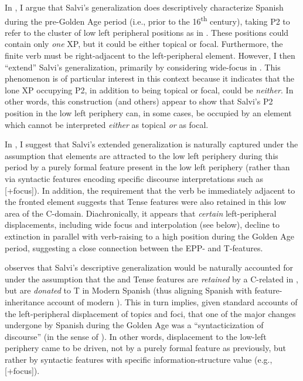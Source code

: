 \documentclass[output=paper]{LSP/langsci}
\begin{document}
In , I argue that Salvi’s generalization does descriptively characterize Spanish during the pre-Golden Age period (i.e., prior to the 16\textsuperscript{th} century), taking P2 to refer to the cluster of low left peripheral positions as in .  These positions could contain only \textit{one} XP, but it could be either topical or focal.  Furthermore, the finite verb must be right-adjacent to the left-peripheral element.  However, I then ``extend'' Salvi’s generalization, primarily by considering wide-focus  in  \citep{Mackenzie2010}.  This phenomenon is of particular interest in this context because it indicates that the lone XP occupying P2, in addition to being topical or focal, could be \textit{neither}.  In other words, this construction (and others) appear to show that Salvi’s P2 position in the low left periphery can, in some cases, be occupied by an element which cannot be interpreted \textit{either} as topical \textit{or} as focal.

In , I suggest that Salvi’s extended generalization is naturally captured under the assumption that elements are attracted to the low left periphery during this period by a purely formal  feature present in the low left periphery (rather than via syntactic features encoding specific discourse interpretations such as [+focus]).  In addition, the requirement that the verb be immediately adjacent to the fronted element suggests that Tense features were also retained in this low area of the C-domain.  Diachronically, it appears that \textit{certain} left-peripheral displacements, including wide focus  and interpolation (see below), decline to extinction in parallel with verb-raising to a high position during the Golden Age period, suggesting a close connection between the EPP- and T-features.  

 observes that Salvi’s descriptive generalization would be naturally accounted for under the assumption that the  and Tense features are \textit{retained} by a C-related  in , but are \textit{donated} to T in Modern Spanish (thus aligning Spanish with  feature-inheritance account of modern ).  This in turn implies, given standard accounts of the left-peripheral displacement of topics and foci, that one of the major changes undergone by Spanish during the Golden Age was a ``syntacticization of discourse'' (in the sense of \citealt{HaegemanHill2013}).   In other words, displacement to the low-left periphery came to be driven, not by a purely formal  feature as previously, but rather by syntactic features with specific information-structure value (e.g., [+focus]).
\end{document}
